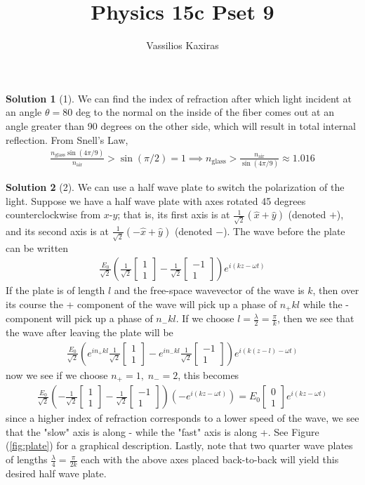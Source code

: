 \documentclass[11pt]{article}
\author{Vassilios Kaxiras}
\title{Physics 15c Pset 9}
\theoremstyle{definition}
\newtheorem*{solution}{Solution}
\newcommand{\eq}{\begin{equation}\begin{aligned}}
\newcommand{\qe}{\end{aligned}\end{equation}}
\newcommand{\mat}{\begin{bmatrix}}
\newcommand{\tam}{\end{bmatrix}}
\begin{document}
\maketitle

\begin{solution}[1]
  We can find the index of refraction after which light incident at an angle $\theta=80$ deg to the normal on the inside of the fiber comes out at an angle greater than 90 degrees on the other side, which will result in total internal reflection. From Snell's Law,
  \eq
    \frac{n_{\text{glass}}\sin(4\pi/9)}{n_{\text{air}}}> \sin(\pi/2)=1\implies \boxed{n_{\text{glass}}>\frac{n_{\text{air}}}{\sin(4\pi/9)}\approx 1.016}
  \qe
\end{solution}

\begin{solution}[2]
  We can use a half wave plate to switch the polarization of the light. Suppose we have a half wave plate with axes rotated 45 degrees counterclockwise from $x$-$y$; that is, its first axis is at $\frac{1}{\sqrt{2}}(\hat{x}+\hat{y})$ (denoted $+$), and its second axis is at $\frac{1}{\sqrt{2}}(-\hat{x}+\hat{y})$ (denoted $-$). The wave before the plate can be written
  \eq
    \frac{E_0}{\sqrt{2}}\left(\frac{1}{\sqrt{2}}\mat 1 \\ 1\tam-\frac{1}{\sqrt{2}}\mat -1 \\ 1\tam\right)e^{i(kz-\omega t)}
  \qe
  If the plate is of length $l$ and the free-space wavevector of the wave is $k$, then over its course the + component of the wave will pick up a phase of $n_+kl$ while the - component will pick up a phase of $n_-kl$. If we choose $l=\frac{\lambda}{2}=\frac{\pi}{k}$, then we see that the wave after leaving the plate will be
  \eq
    \frac{E_0}{\sqrt{2}}\left(e^{in_+kl}\frac{1}{\sqrt{2}}\mat 1 \\ 1\tam-e^{in_-kl}\frac{1}{\sqrt{2}}\mat -1 \\ 1\tam\right)e^{i(k(z-l)-\omega t)}
  \qe
  now we see if we choose $n_+=1,\;n_-=2$, this becomes
  \eq
    \frac{E_0}{\sqrt{2}}\left(-\frac{1}{\sqrt{2}}\mat 1 \\ 1\tam-\frac{1}{\sqrt{2}}\mat -1 \\ 1\tam\right)(-e^{i(kz-\omega t)})=E_0\mat 0 \\ 1 \tam e^{i(kz-\omega t)}
  \qe
  since a higher index of refraction corresponds to a lower speed of the wave, we see that the "slow" axis is along - while the "fast" axis is along +. See Figure (\ref{fig:plate}) for a graphical description. Lastly, note that two quarter wave plates of lengths $\frac{\lambda}{4}=\frac{\pi}{2k}$ each with the above axes placed back-to-back will yield this desired half wave plate.

\end{solution}
\end{document}
